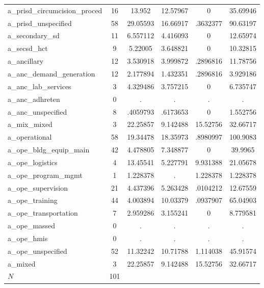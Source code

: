 \begin{table}[htbp]
\begin{tabular}{l*{1}{ccccc}}
a\_prisd\_circumcision\_proced&          16&      13.952&    12.57967&           0&    35.69946\\
a\_prisd\_unspecified&          58&    29.05593&    16.66917&    .3632377&    90.63197\\
a\_secondary\_sd&          11&    6.557112&    4.416093&           0&    12.65974\\
a\_secsd\_hct &           9&     5.22005&    3.648821&           0&    10.32815\\
a\_ancillary &          12&    3.530918&    3.999872&    .2896816&    11.78756\\
a\_anc\_demand\_generation&          12&    2.177894&    1.432351&    .2896816&    3.929186\\
a\_anc\_lab\_services&           3&    4.329486&    3.757215&           0&    6.735747\\
a\_anc\_adhreten&           0&           .&           .&           .&           .\\
a\_anc\_unspecified&           8&    .4059793&    .6173653&           0&    1.552756\\
a\_mix\_mixed &           3&    22.25857&    9.142488&    15.52756&    32.66717\\
a\_operational&          58&    19.34478&    18.35973&    .8980997&    100.9083\\
a\_ope\_bldg\_equip\_main&          42&    4.478805&    7.348877&           0&     39.9965\\
a\_ope\_logistics&           4&    13.45541&    5.227791&    9.931388&    21.05678\\
a\_ope\_program\_mgmt&           1&    1.228378&           .&    1.228378&    1.228378\\
a\_ope\_supervision&          21&    4.437396&    5.263428&    .0104212&    12.67559\\
a\_ope\_training&          44&    4.003894&    10.03379&    .0937907&    65.04903\\
a\_ope\_transportation&           7&    2.959286&    3.155241&           0&    8.779581\\
a\_ope\_massed&           0&           .&           .&           .&           .\\
a\_ope\_hmis  &           0&           .&           .&           .&           .\\
a\_ope\_unspecified&          52&    11.32242&    10.71788&    1.114038&    45.91574\\
a\_mixed     &           3&    22.25857&    9.142488&    15.52756&    32.66717\\
\hline
\(N\)       &         101&            &            &            &            \\
\hline\hline
\end{tabular}
\end{table}
